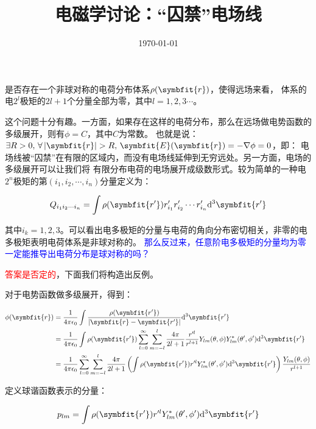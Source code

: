 \documentclass[11pt,a4paper]{ctexart}
\title{电磁学讨论：“囚禁”电场线}
\author{}
\date{\today}
\newcommand{\dd}{\mathrm{d}}
\begin{document}
\maketitle

{
    \kaishu 是否存在一个非球对称的电荷分布体系$\rho(\symbfit{r})$，使得远场来看，
    体系的电$2^l$极矩的$2l+1$个分量全部为零，其中$l=1,2,3\cdots$。
    \label{question}
}

\bigskip

这个问题十分有趣。一方面，如果存在这样的电荷分布，那么在远场做电势函数的多级展开，则有$\phi=C$，其中$C$为常数。
也就是说：$\exists R>0,\,\forall\left|\symbfit{r}\right|>R,\,\symbfit{E}(\symbfit{r})=-\nabla\phi=0$，即：
电场线被“囚禁”在有限的区域内，而没有电场线延伸到无穷远处。另一方面，电场的多级展开可以让我们将
有限分布电荷的电场展开成级数形式。较为简单的一种电$2^n$极矩的第$(i_1,i_2,\cdots,i_n)$分量定义为：

\begin{equation}
    Q_{i_1i_2\cdots i_n}=\int\rho(\symbfit{r'})r'_{i_1}r'_{i_2}\cdots r'_{i_n}\dd^3\symbfit{r'}
    \label{eq:define}
\end{equation}

其中$i_k=1,2,3$。可以看出电多极矩的分量与电荷的角向分布密切相关，非零的电多极矩表明电荷体系是非球对称的。
\textcolor{blue}{那么反过来，任意阶电多极矩的分量均为零一定能推导出电荷分布是球对称的吗？}

\bigskip

\textcolor{red}{答案是否定的}，下面我们将构造出反例。

\bigskip

对于电势函数做多级展开，得到：

\begin{align}
    \phi(\symbfit{r})&=\frac{1}{4\pi\epsilon_0}\int\frac{\rho(\symbfit{r'})}{\left|\symbfit{r}-\symbfit{r'}\right|}\dd^3\symbfit{r'} \notag \\
    &=\frac{1}{4\pi\epsilon_0}\int\rho(\symbfit{r'})\sum_{l=0}^{\infty}\sum_{m=-l}^{l}\frac{4\pi}{2l+1}\frac{r'^l}{r^{l+1}}Y_{lm}(\theta,\phi)Y_{lm}^*(\theta',\phi')\dd^3\symbfit{r'} \notag\\
    &=\frac{1}{4\pi\epsilon_0}\sum_{l=0}^{\infty}\sum_{m=-l}^{l}\frac{4\pi}{2l+1}\left(\int\rho(\symbfit{r'})r'^lY_{lm}^*(\theta',\phi')\dd^3\symbfit{r'}\right)\frac{Y_{lm}(\theta,\phi)}{r^{l+1}}
    \label{eq:Multipole}
\end{align}

定义球谐函数表示的分量：

\begin{equation}
    p_{lm}=\int\rho(\symbfit{r'})r'^lY_{lm}^*(\theta',\phi')\dd^3\symbfit{r'}
\end{equation}
\end{document}
